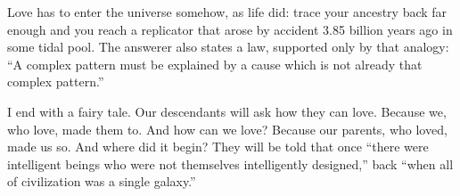 Love has to enter the universe somehow, as life did: trace your ancestry back far enough and you reach a replicator that arose by accident 3.85 billion years ago in some tidal pool. The answerer also states a law, supported only by that analogy: ``A complex pattern must be explained by a cause which is not already that complex pattern.'' 

I end with a fairy tale. Our descendants will ask how they can love. Because we, who love, made them to. And how can we love? Because our parents, who loved, made us so. And where did it begin? They will be told that once ``there were intelligent beings who were not themselves intelligently designed,'' back ``when all of civilization was a single galaxy.'' 
